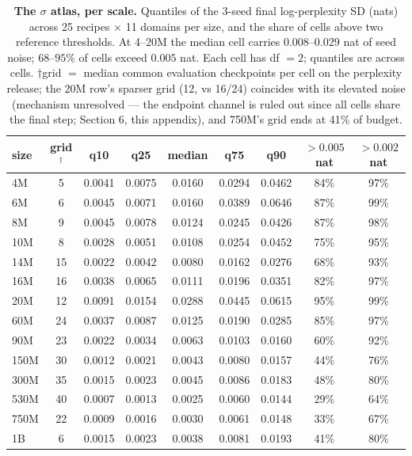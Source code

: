 \begin{table}[!htbp]
\centering
\caption{\textbf{The $\sigma$ atlas, per scale.} Quantiles of the 3-seed final log-perplexity SD
(nats) across 25 recipes $\times$ 11 domains per size, and the share of cells above two
reference thresholds. At 4--20M the median cell carries $0.008$--$0.029$ nat of seed noise;
$68$--$95\%$ of cells exceed $0.005$ nat. Each cell has df $= 2$; quantiles are across cells. $\dagger$grid $=$ median common evaluation checkpoints per cell on the perplexity release; the 20M row's sparser grid (12, vs 16/24) coincides with its elevated noise (mechanism unresolved --- the endpoint channel is ruled out since all cells share the final step; Section 6, this appendix), and 750M's grid ends at 41\% of budget.}
\label{tab:sigma}
\footnotesize
\setlength{\tabcolsep}{4pt}
\begin{tabular}{@{}lcccccccc@{}}
\toprule
size & grid$^{\dagger}$ & q10 & q25 & median & q75 & q90 & $> 0.005$ nat & $> 0.002$ nat \\
\midrule
4M & 5 & 0.0041 & 0.0075 & 0.0160 & 0.0294 & 0.0462 & 84\% & 97\% \\
6M & 6 & 0.0045 & 0.0071 & 0.0160 & 0.0389 & 0.0646 & 87\% & 99\% \\
8M & 9 & 0.0045 & 0.0078 & 0.0124 & 0.0245 & 0.0426 & 87\% & 98\% \\
10M & 8 & 0.0028 & 0.0051 & 0.0108 & 0.0254 & 0.0452 & 75\% & 95\% \\
14M & 15 & 0.0022 & 0.0042 & 0.0080 & 0.0162 & 0.0276 & 68\% & 93\% \\
16M & 16 & 0.0038 & 0.0065 & 0.0111 & 0.0196 & 0.0351 & 82\% & 97\% \\
20M & 12 & 0.0091 & 0.0154 & 0.0288 & 0.0445 & 0.0615 & 95\% & 99\% \\
60M & 24 & 0.0037 & 0.0087 & 0.0125 & 0.0190 & 0.0285 & 85\% & 97\% \\
90M & 23 & 0.0022 & 0.0034 & 0.0063 & 0.0103 & 0.0160 & 60\% & 92\% \\
150M & 30 & 0.0012 & 0.0021 & 0.0043 & 0.0080 & 0.0157 & 44\% & 76\% \\
300M & 35 & 0.0015 & 0.0023 & 0.0045 & 0.0086 & 0.0183 & 48\% & 80\% \\
530M & 40 & 0.0007 & 0.0013 & 0.0025 & 0.0060 & 0.0144 & 29\% & 64\% \\
750M & 22 & 0.0009 & 0.0016 & 0.0030 & 0.0061 & 0.0148 & 33\% & 67\% \\
1B & 6 & 0.0015 & 0.0023 & 0.0038 & 0.0081 & 0.0193 & 41\% & 80\% \\
\bottomrule
\end{tabular}
\end{table}

